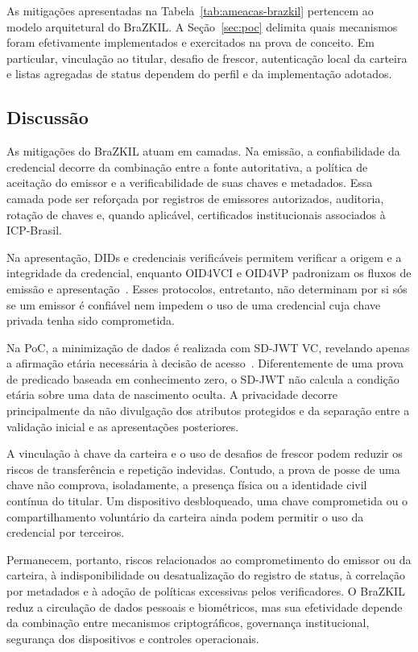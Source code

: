 \documentclass[12pt]{article}
\begin{document}
As mitigações apresentadas na Tabela~\ref{tab:ameacas-brazkil} pertencem ao modelo arquitetural do BraZKIL. A Seção~\ref{sec:poc} delimita quais mecanismos foram efetivamente implementados e exercitados na prova de conceito. Em particular, vinculação ao titular, desafio de frescor, autenticação local da carteira e listas agregadas de status dependem do perfil e da implementação adotados.

\subsection{Discussão}
\label{sec:discussao-seguranca}

As mitigações do BraZKIL atuam em camadas. Na emissão, a confiabilidade da credencial decorre da combinação entre a fonte autoritativa, a política de aceitação do emissor e a verificabilidade de suas chaves e metadados. Essa camada pode ser reforçada por registros de emissores autorizados, auditoria, rotação de chaves e, quando aplicável, certificados institucionais associados à ICP-Brasil.

Na apresentação, DIDs e credenciais verificáveis permitem verificar a origem e a integridade da credencial, enquanto OID4VCI e OID4VP padronizam os fluxos de emissão e apresentação~\cite{openid4vci2024,openid4vp2023}. Esses protocolos, entretanto, não determinam por si sós se um emissor é confiável nem impedem o uso de uma credencial cuja chave privada tenha sido comprometida.

Na PoC, a minimização de dados é realizada com SD-JWT VC, revelando apenas a afirmação etária necessária à decisão de acesso~\cite{sdjwtvc2024}. Diferentemente de uma prova de predicado baseada em conhecimento zero, o SD-JWT não calcula a condição etária sobre uma data de nascimento oculta. A privacidade decorre principalmente da não divulgação dos atributos protegidos e da separação entre a validação inicial e as apresentações posteriores.

A vinculação à chave da carteira e o uso de desafios de frescor podem reduzir os riscos de transferência e repetição indevidas. Contudo, a prova de posse de uma chave não comprova, isoladamente, a presença física ou a identidade civil contínua do titular. Um dispositivo desbloqueado, uma chave comprometida ou o compartilhamento voluntário da carteira ainda podem permitir o uso da credencial por terceiros.

Permanecem, portanto, riscos relacionados ao comprometimento do emissor ou da carteira, à indisponibilidade ou desatualização do registro de status, à correlação por metadados e à adoção de políticas excessivas pelos verificadores. O BraZKIL reduz a circulação de dados pessoais e biométricos, mas sua efetividade depende da combinação entre mecanismos criptográficos, governança institucional, segurança dos dispositivos e controles operacionais.
\end{document}
